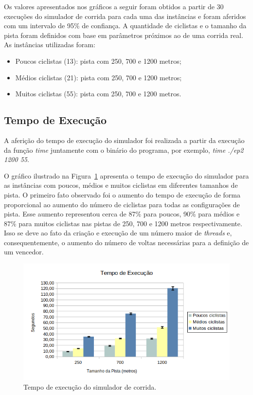 \documentclass[12pt]{article}
\begin{document}
Os valores apresentados nos gráficos a seguir foram obtidos a partir de 30 execuções do simulador de corrida para cada uma das instâncias e foram aferidos com um intervalo de 95\% de confiança. A quantidade de ciclistas e o tamanho da pista foram definidos com base em parâmetros próximos ao de uma corrida real. As instâncias utilizadas foram:

\begin{itemize}
	\item Poucos ciclistas (13): pista com 250, 700 e 1200 metros;
	\item Médios ciclistas (21): pista com 250, 700 e 1200 metros;
	\item Muitos ciclistas (55): pista com 250, 700 e 1200 metros.
\end{itemize}

\subsection{Tempo de Execução}

A aferição do tempo de execução do simulador foi realizada a partir da execução da função \textit{time} juntamente com o binário do programa, por exemplo, \textit{time ./ep2 1200 55}.

O gráfico ilustrado na Figura~\ref{fig:time} apresenta o tempo de execução do simulador para as instâncias com poucos, médios e muitos ciclistas em diferentes tamanhos de pista. O primeiro fato observado foi o aumento do tempo de execução de forma proporcional ao aumento do número de ciclistas para todas as configurações de pista. Esse aumento representou cerca de 87\% para poucos, 90\% para médios e 87\% para muitos ciclistas nas pistas de 250, 700 e 1200 metros respectivamente. Isso se deve ao fato da criação e execução de um número maior de \textit{threads} e, consequentemente, o aumento do número de voltas necessárias para a definição de um vencedor.

\begin{figure}[H]
	\centering
	\includegraphics[width=1\textwidth]{time.png}
	\caption{Tempo de execução do simulador de corrida.}
	\label{fig:time}
\end{figure}
\end{document}
